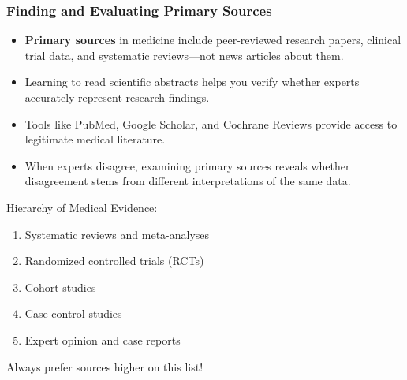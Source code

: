 \documentclass{beamer}
\begin{document}
	\begin{frame}
		\frametitle{Finding and Evaluating Primary Sources}
		\begin{itemize}
			\item \textbf{Primary sources} in medicine include peer-reviewed research papers, clinical trial data, and systematic reviews—not news articles about them.
			\item Learning to read scientific abstracts helps you verify whether experts accurately represent research findings.
			\item Tools like PubMed, Google Scholar, and Cochrane Reviews provide access to legitimate medical literature.
			\item When experts disagree, examining primary sources reveals whether disagreement stems from different interpretations of the same data.
		\end{itemize}
		
		\begin{example}
			\scriptsize
			Hierarchy of Medical Evidence:
			\begin{enumerate}
				\item Systematic reviews and meta-analyses
				\item Randomized controlled trials (RCTs)
				\item Cohort studies
				\item Case-control studies
				\item Expert opinion and case reports
			\end{enumerate}
			Always prefer sources higher on this list!
		\end{example}
	\end{frame}
	
\end{document}
